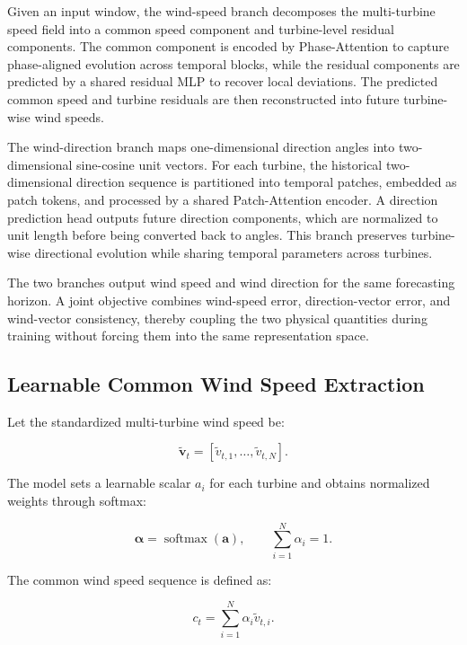Given an input window, the wind-speed branch decomposes the multi-turbine speed field into a common speed component and turbine-level residual components. The common component is encoded by Phase-Attention to capture phase-aligned evolution across temporal blocks, while the residual components are predicted by a shared residual MLP to recover local deviations. The predicted common speed and turbine residuals are then reconstructed into future turbine-wise wind speeds.

The wind-direction branch maps one-dimensional direction angles into two-dimensional sine-cosine unit vectors. For each turbine, the historical two-dimensional direction sequence is partitioned into temporal patches, embedded as patch tokens, and processed by a shared Patch-Attention encoder. A direction prediction head outputs future direction components, which are normalized to unit length before being converted back to angles. This branch preserves turbine-wise directional evolution while sharing temporal parameters across turbines.

The two branches output wind speed and wind direction for the same forecasting horizon. A joint objective combines wind-speed error, direction-vector error, and wind-vector consistency, thereby coupling the two physical quantities during training without forcing them into the same representation space.



\subsection{Learnable Common Wind Speed Extraction}

Let the standardized multi-turbine wind speed be:

\begin{equation}
\tilde{\mathbf{v}}_t = \left[ \tilde{v}_{t,1}, \ldots, \tilde{v}_{t,N} \right].
\end{equation}

The model sets a learnable scalar $a_i$ for each turbine and obtains normalized weights through softmax:

\begin{equation}
\boldsymbol{\alpha} = \operatorname{softmax}(\mathbf{a}), \qquad \sum_{i=1}^{N}\alpha_i=1.
\end{equation}

The common wind speed sequence is defined as:

\begin{equation}
c_t = \sum_{i=1}^{N}\alpha_i\tilde{v}_{t,i}.
\end{equation}

